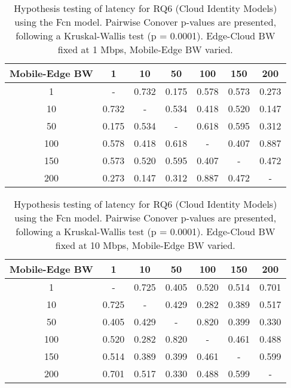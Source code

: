 \begin{table}[H]
\caption{Hypothesis testing of latency for RQ6 (Cloud Identity Models) using the Fcn model. Pairwise Conover p-values are presented, following a Kruskal-Wallis test (p = 0.0001). Edge-Cloud BW fixed at 1 Mbps, Mobile-Edge BW varied.}
\centering
\begin{tabular}{c|cccccc}
Mobile-Edge BW & 1 & 10 & 50 & 100 & 150 & 200 \\
\hline
1 & - & 0.732 & 0.175 & 0.578 & 0.573 & 0.273 \\
10 & 0.732 & - & 0.534 & 0.418 & 0.520 & 0.147 \\
50 & 0.175 & 0.534 & - & 0.618 & 0.595 & 0.312 \\
100 & 0.578 & 0.418 & 0.618 & - & 0.407 & 0.887 \\
150 & 0.573 & 0.520 & 0.595 & 0.407 & - & 0.472 \\
200 & 0.273 & 0.147 & 0.312 & 0.887 & 0.472 & - \\
\end{tabular}
\end{table}

\begin{table}[H]
\caption{Hypothesis testing of latency for RQ6 (Cloud Identity Models) using the Fcn model. Pairwise Conover p-values are presented, following a Kruskal-Wallis test (p = 0.0001). Edge-Cloud BW fixed at 10 Mbps, Mobile-Edge BW varied.}
\centering
\begin{tabular}{c|cccccc}
Mobile-Edge BW & 1 & 10 & 50 & 100 & 150 & 200 \\
\hline
1 & - & 0.725 & 0.405 & 0.520 & 0.514 & 0.701 \\
10 & 0.725 & - & 0.429 & 0.282 & 0.389 & 0.517 \\
50 & 0.405 & 0.429 & - & 0.820 & 0.399 & 0.330 \\
100 & 0.520 & 0.282 & 0.820 & - & 0.461 & 0.488 \\
150 & 0.514 & 0.389 & 0.399 & 0.461 & - & 0.599 \\
200 & 0.701 & 0.517 & 0.330 & 0.488 & 0.599 & - \\
\end{tabular}
\end{table}

